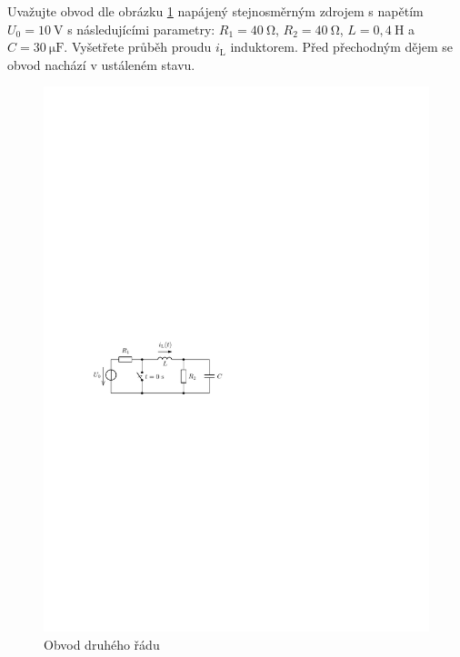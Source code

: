 Uvažujte obvod dle obrázku \ref{fig:druhy_rad_priklad_1} napájený stejnosměrným zdrojem s napětím $U_0 = 10~\mathrm{V}$ s následujícími parametry: $R_1 = 40~\mathrm{\Omega}$, $R_2 = 40~\mathrm{\Omega}$, $L = 0,4~\mathrm{H}$ a $C = 30~\mathrm{\mu F}$. Vyšetřete průběh proudu $i_\mathrm{L}$ induktorem. Před přechodným dějem se obvod nachází v ustáleném stavu.
\begin{figure}[h!]
\centering
\includegraphics[]{prechodne_jevy/druhy_rad/priklad_1.pdf}
\caption{Obvod druhého řádu}
\label{fig:druhy_rad_priklad_1}
\end{figure}
